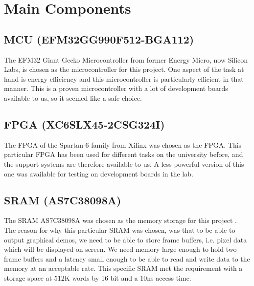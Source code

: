 \documentclass[../main/report.tex]{subfiles}
\begin{document}
\section{Main Components}

\subsection*{MCU (EFM32GG990F512-BGA112)}
The EFM32 Giant Gecko Microcontroller from former Energy Micro, now Silicon Labs, is chosen as the microcontroller for this project.
One aspect of the task at hand is energy efficiency and this microcontroller is particularly efficient in that manner.
This is a proven microcontroller with a lot of development boards available to us, so it seemed like a safe choice.

\subsection*{FPGA (XC6SLX45-2CSG324I)}
The FPGA of the Spartan-6 family from Xilinx was chosen as the FPGA.
This particular FPGA has been used for different tasks on the university before, and the support systems are therefore available to us.
A less powerful version of this one was available for testing on development boards in the lab.

\subsection*{SRAM (AS7C38098A)}
The SRAM AS7C38098A was chosen as the memory storage for this project \cite{SRAM-datasheet}.
The reason for why this particular SRAM was chosen, was that to be able to output graphical demos, we need to be able to store frame buffers, i.e. pixel data which will be displayed on screen.
We need memory large enough to hold two frame buffers and a latency small enough to be able to read and write data to the memory at an acceptable rate.
This specific SRAM met the requirement with a storage space at 512K words by 16 bit and a 10ns access time.
\end{document}
